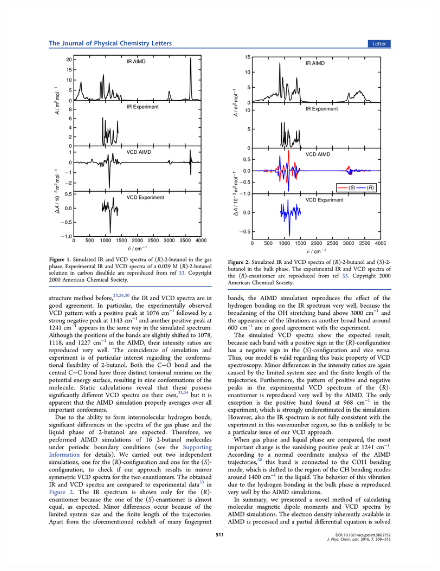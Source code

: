 \documentclass[t]{beamer}
\begin{document}
\begin{frame}
\begin{columns}
\begin{figure}
                \includegraphics[width=.95\textwidth]{figures/butanol_bulk_vcd.pdf}
            \end{figure} 
        \end{columns}
	\end{frame}
\end{document}
